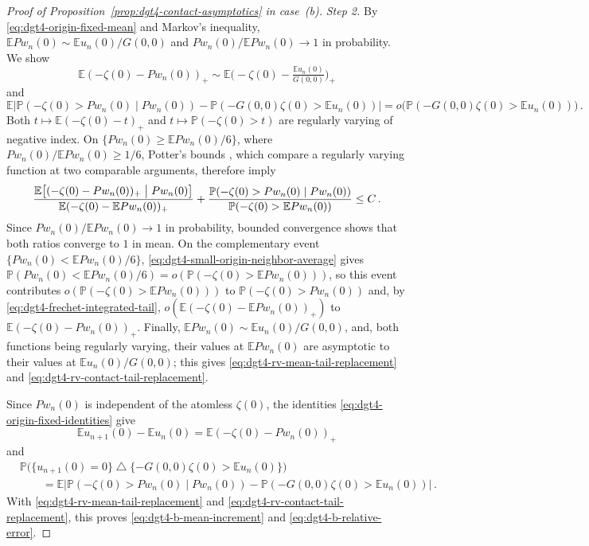 \documentclass[11pt]{amsart}
\theoremstyle{plain}
\theoremstyle{definition}
\newcommand{\E}{\mathbb{E}}
\renewcommand{\P}{\mathbb{P}}
\begin{document}
\begin{proof}[Proof of Proposition~\ref{prop:dgt4-contact-asymptotics} in case~\textup{(b)}]
	\noindent\emph{Step 2.} By \eqref{eq:dgt4-origin-fixed-mean} and Markov's inequality,
	$\E Pw_n(0)\sim\E u_n(0)/G(0,0)$ and $Pw_n(0)/\E Pw_n(0)\to1$ in probability. We show
	\begin{equation}\label{eq:dgt4-rv-mean-tail-replacement}
		\E(-\zeta(0)-Pw_n(0))_+\sim\E\bigl(-\zeta(0)-\tfrac{\E u_n(0)}{G(0,0)}\bigr)_+
	\end{equation}
	and
	\begin{equation}\label{eq:dgt4-rv-contact-tail-replacement}
		\E\bigl|\P(-\zeta(0)>Pw_n(0)\mid Pw_n(0))-\P(-G(0,0)\zeta(0)>\E u_n(0))\bigr|
		=o\bigl(\P(-G(0,0)\zeta(0)>\E u_n(0))\bigr)\, .
	\end{equation}
	Both $t\mapsto\E(-\zeta(0)-t)_+$ and $t\mapsto\P(-\zeta(0)>t)$ are regularly varying of
	negative index. On $\{Pw_n(0)\geq\E Pw_n(0)/6\}$, where $Pw_n(0)/\E Pw_n(0)\geq1/6$,
	Potter's bounds \citep[Proposition~B.1.9(5)]{deHaanFerreira}, which compare a regularly varying function at two comparable arguments, therefore imply
	\[
		\frac{\E\bigl[(-\zeta(0)-Pw_n(0))_+\bigm|Pw_n(0)\bigr]}{\E(-\zeta(0)-\E Pw_n(0))_+}
		+
		\frac{\P(-\zeta(0)>Pw_n(0)\mid Pw_n(0))}{\P(-\zeta(0)>\E Pw_n(0))}
		\leq C\, .
	\]
	Since $Pw_n(0)/\E Pw_n(0)\to1$ in probability, bounded convergence shows that both ratios converge to $1$ in mean. On the complementary event $\{Pw_n(0)<\E Pw_n(0)/6\}$, \eqref{eq:dgt4-small-origin-neighbor-average} gives
	$\P(Pw_n(0)<\E Pw_n(0)/6)=o(\P(-\zeta(0)>\E Pw_n(0)))$, so this event contributes
	$o(\P(-\zeta(0)>\E Pw_n(0)))$ to $\P(-\zeta(0)>Pw_n(0))$ and, by
	\eqref{eq:dgt4-frechet-integrated-tail},
	$o(\E(-\zeta(0)-\E Pw_n(0))_+)$ to $\E(-\zeta(0)-Pw_n(0))_+$. Finally,
	$\E Pw_n(0)\sim\E u_n(0)/G(0,0)$, and, both functions being regularly varying, their values
	at $\E Pw_n(0)$ are asymptotic to their values at $\E u_n(0)/G(0,0)$; this gives
	\eqref{eq:dgt4-rv-mean-tail-replacement} and \eqref{eq:dgt4-rv-contact-tail-replacement}.

	Since $Pw_n(0)$ is independent of the atomless $\zeta(0)$, the identities
	\eqref{eq:dgt4-origin-fixed-identities} give
	\[
		\E u_{n+1}(0)-\E u_n(0)=\E(-\zeta(0)-Pw_n(0))_+
	\]
	and
	\[
	\begin{aligned}
		&\P\bigl(\{u_{n+1}(0)=0\}\mathbin{\triangle}\{-G(0,0)\zeta(0)>\E u_n(0)\}\bigr)\\
		&\qquad=\E\bigl|\P(-\zeta(0)>Pw_n(0)\mid Pw_n(0))-\P(-G(0,0)\zeta(0)>\E u_n(0))\bigr|\, .
	\end{aligned}
	\]
	With \eqref{eq:dgt4-rv-mean-tail-replacement} and
	\eqref{eq:dgt4-rv-contact-tail-replacement}, this proves
	\eqref{eq:dgt4-b-mean-increment} and \eqref{eq:dgt4-b-relative-error}.
	\end{proof}
\end{document}

